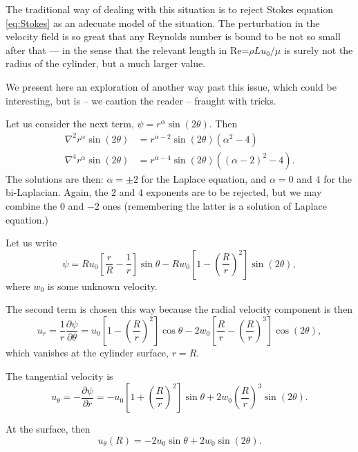 The traditional way of dealing with this situation is to reject Stokes
equation \ref{eq:Stokes} as an adecuate model of the situation. The
perturbation in the velocity field is so great that any Reynolds
number is bound to be not so small after that --- in the sense that
the relevant length in Re=$\rho L u_0 /\mu$ is surely not the radius
of the cylinder, but a much larger value.

We present here an exploration of another way past this issue, which
could be interesting, but is -- we caution the reader -- fraught with
tricks.

Let us consider the next term, $\psi = r^\alpha \sin (2 \theta)$. Then
\begin{align*}
  \nabla^2   r^\alpha \sin(2 \theta)  &=
                                        r^{\alpha-2} \sin(2\theta) \left( \alpha^2 -4  \right) \\
  \nabla^4   r^\alpha \sin(2 \theta)  &=
                                        r^{\alpha-4} \sin(2\theta) \left( (\alpha-2)^2 -4  \right) .
\end{align*}
The solutions are then: $\alpha=\pm 2$ for the Laplace equation, and
$\alpha=0$ and $4$ for the bi-Laplacian. Again, the $2$ and $4$
exponents are to be rejected, but we may combine the $0$ and $-2$ ones
(remembering the latter is a solution of Laplace equation.)

Let us write
\[
  \psi =
  R u_0 \left[ \frac{r}{R} - \frac{1}{r} \right] \sin\theta -
  R w_0 \left[ 1 - \left( \frac{R}{r}\right)^2 \right] \sin( 2\theta) ,
\]
where $w_0$ is some unknown velocity.

The second term is chosen this way because the radial velocity
component is then
\begin{equation*}
  u_r= \frac{1}{r}\frac{\partial \psi}{\partial \theta} =
  u_0 \left[ 1  - \left( \frac{R}{r}\right)^2 \right] \cos\theta -
  2 w_0 \left[ \frac{R}{r} - \left( \frac{R}{r}\right)^3 \right] \cos( 2\theta) ,
\end{equation*}
which vanishes at the cylinder surface, $r=R$.

The tangential velocity is
\begin{equation*}
  u_\theta= - \frac{\partial \psi}{\partial r} =
  - u_0 \left[ 1  + \left( \frac{R}{r}\right)^2 \right] \sin\theta +
  2 w_0 \left( \frac{R}{r}\right)^3 \sin( 2\theta) .
\end{equation*}

At the surface, then
\begin{equation*}
  u_\theta(R) =
  - 2 u_0 \sin\theta + 2 w_0 \sin( 2\theta) .
\end{equation*}

